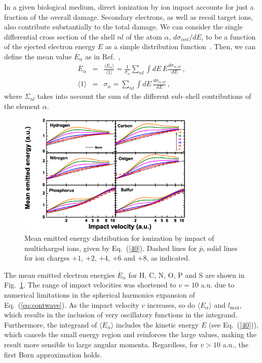 \documentclass[preprint]{revtex4-2}
\begin{document}
In a given biological medium, direct ionization by ion impact accounts 
for just a fraction of the overall damage. Secondary electrons, as well 
as recoil target ions, also contribute substantially to the total damage. 
We can consider the single differential cross section of the shell 
$nl$ of the atom $\alpha$, $d\sigma_{\alpha nl}/dE$, to be a function 
of the ejected electron energy $E$ as a simple distribution 
function~\cite{surdutovic2018}. Then, we can define the mean value 
$\overline{E}_{\alpha}$ as in Ref.~\cite{abril2015},
\begin{eqnarray}
\overline{E}_{\alpha} &=&\frac{\langle E_{\alpha}\rangle}{\langle
1\rangle}=\frac{1}{\sigma_{\alpha}}\sum\limits_{nl}\int dE\,E
\frac{d\sigma_{\alpha,nl}}{dE}\,,  
\label{40} \\
\langle 1\rangle &=&\sigma_{\alpha}=\sum\limits_{nl}\int dE\,
\frac{d\sigma_{\alpha,nl}}{dE}\,,  
\label{50}
\end{eqnarray}
where $\Sigma_{nl}$ takes into account the sum of the different 
sub--shell contributions of the element $\alpha$.

\begin{figure}[t!]
\centering
\includegraphics[width=0.75\textwidth]{figuras/Fig_finales/fig5.eps}
\caption{Mean emitted energy distribution for ionization by impact of
multicharged ions, given by Eq.~(\ref{40}). Dashed lines for $\bar{p}$,
solid lines for ion charges $+1$, $+2$, $+4$, $+6$ and $+8$,
as indicated.}
\label{fig:emittedener}
\end{figure} 

The mean emitted electron energies $\overline{E}_{\alpha}$ for H, C, N, 
O, P and S are shown in Fig.~\ref{fig:emittedener}. The range of impact 
velocities was shortened to $v=10$ a.u. due to numerical limitations 
in the spherical harmonics expansion of Eq.~(\ref{eq:contwave}). 
As the impact velocity $v$ increases, so do $\langle E_{\alpha}\rangle$
and $l_{\max}$, which results in the inclusion of very oscillatory 
functions in the integrand. Furthermore, the integrand of
$\langle E_{\alpha}\rangle$ includes the kinetic energy $E$
(see Eq.~(\ref{40})), which cancels the small energy region and 
reinforces the large values, making the result more sensible to large
angular momenta. Regardless, for $v>10$ a.u., the first Born 
approximation holds.
\end{document}
